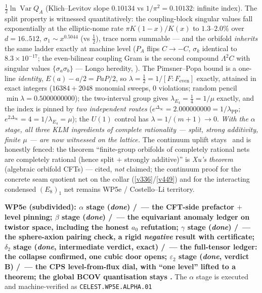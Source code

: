 $\tfrac12\ln\operatorname{Var}Q_A$ (Klich--Levitov slope $0.10134$ vs $1/\pi^2=0.10132$: infinite
index). The split property is witnessed quantitatively: the coupling-block singular values fall
exponentially at the elliptic-nome rate $\pi K(1-x)/K(x)$ to $1.3$--$2.0\%$ over $d=16..512$,
$\sigma_1\sim x^{0.5044}$ (vs $\tfrac12$), trace norm summable --- and the orbifold \emph{inherits}
the same ladder exactly at machine level ($P_A$ flips $C\to-C$, $\sigma_k$ identical to
$8.3\times10^{-17}$; the even-bilinear coupling Gram is the second compound $\Lambda^2C$ with
singular values $\{\sigma_a\sigma_b\}$ --- Longo heredity, \mC). The Pimsner--Popa bound is a
one-line \emph{identity}, $E(a)-a/2=PaP/2$, so $\lambda=\tfrac12=1/[F:F_{\mathrm{even}}]$ exactly,
attained in exact integers ($16384+2048$ monomial sweeps, $0$ violations; random pencil
$\min\lambda=0.5000000000$); the two-interval group gives $\lambda_{E_4}=\tfrac14=1/\mu$ exactly,
and the index is pinned by \emph{two independent routes}
($e^{\Delta_\infty}=2.000000000=1/\lambda_{\mathrm{PP}}$;
$e^{2\Delta_\infty}=4=1/\lambda_{E_4}=\mu$); the $U(1)$ control has $\lambda=1/(m{+}1)\to0$.
\emph{With the $\alpha$ stage, all three KLM ingredients of complete rationality --- split, strong
additivity, finite $\mu$ --- are now witnessed on the lattice.} The continuum uplift stays \mO\ and
is honestly fenced: the theorem ``finite-group orbifolds of completely rational nets are completely
rational (hence split $+$ strongly additive)'' is \emph{Xu's theorem} (algebraic orbifold CFTs) ---
cited, \emph{not} claimed; the continuum proof for the concrete seam quotient net on the collar
(\vref{v336}/\vref{v449}) and for the interacting condensed $(E_8)_1$ net remains WP5e /
Costello--Li territory.
\item \textbf{WP5e (subdivided): $\alpha$ stage (\emph{done}) \mE/\mC\ --- the CFT-side prefactor
$+$ level pinning; $\beta$ stage (\emph{done}) \mE/\mC\ --- the equivariant anomaly ledger on
twistor space, including the honest $a_0$ refutation; $\gamma$ stage (\emph{done}) \mE/\mC\ ---
the sphere-axion pairing check, a rigid \emph{negative} result with certificate; $\delta_2$ stage
(\emph{done}, intermediate verdict, exact) \mE/\mC\ --- the full-tensor ledger: the collapse
confirmed, one cubic door opens; $\varepsilon_2$
stage (\emph{done}, verdict B) \mE/\mC\ --- the CPS level-from-flux dial, with ``one level''
lifted to a theorem; the global BCOV quantisation stays \mO.}
The $\alpha$ stage is executed and
machine-verified as \texttt{CELEST.WP5E.ALPHA.01} 
